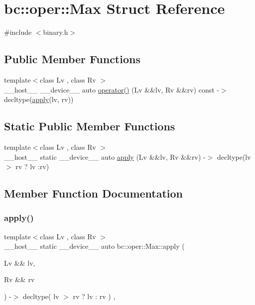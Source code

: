 \hypertarget{structbc_1_1oper_1_1Max}{}\section{bc\+:\+:oper\+:\+:Max Struct Reference}
\label{structbc_1_1oper_1_1Max}


{\ttfamily \#include $<$binary.\+h$>$}

\subsection*{Public Member Functions}
\begin{DoxyCompactItemize}
\item 
{\footnotesize template$<$class Lv , class Rv $>$ }\\\+\_\+\+\_\+host\+\_\+\+\_\+ \+\_\+\+\_\+device\+\_\+\+\_\+ auto \hyperlink{structbc_1_1oper_1_1Max_a40217402cdff8b6fc6aabc042c4ccf31}{operator()} (Lv \&\&lv, Rv \&\&rv) const -\/$>$ decltype(\hyperlink{structbc_1_1oper_1_1Max_a5679773915eae039e36b1eee4b9aae18}{apply}(lv, rv))
\end{DoxyCompactItemize}
\subsection*{Static Public Member Functions}
\begin{DoxyCompactItemize}
\item 
{\footnotesize template$<$class Lv , class Rv $>$ }\\\+\_\+\+\_\+host\+\_\+\+\_\+ static \+\_\+\+\_\+device\+\_\+\+\_\+ auto \hyperlink{structbc_1_1oper_1_1Max_a5679773915eae039e36b1eee4b9aae18}{apply} (Lv \&\&lv, Rv \&\&rv) -\/$>$ decltype(lv $>$ rv ? lv \+:rv)
\end{DoxyCompactItemize}


\subsection{Member Function Documentation}
\mbox{\label{structbc_1_1oper_1_1Max_a5679773915eae039e36b1eee4b9aae18}} 
\subsubsection{\texorpdfstring{apply()}{apply()}}
{\footnotesize\ttfamily template$<$class Lv , class Rv $>$ \\
\+\_\+\+\_\+host\+\_\+\+\_\+ static \+\_\+\+\_\+device\+\_\+\+\_\+ auto bc\+::oper\+::\+Max\+::apply (\begin{DoxyParamCaption}\item[{Lv \&\&}]{lv,  }\item[{Rv \&\&}]{rv }\end{DoxyParamCaption}) -\/$>$ decltype( lv $>$ rv ? lv \+: rv ) \hspace{0.3cm}{\ttfamily [inline]}, {\ttfamily [static]}}

